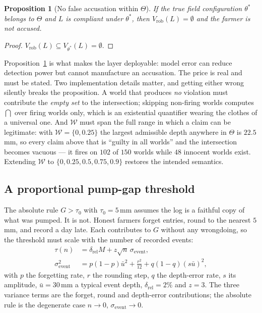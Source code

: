 \documentclass[journal]{IEEEtran}
\newtheorem{proposition}{Proposition}
\begin{document}
\begin{proposition}[No false accusation within $\Theta$]
\label{prop:noalarm}
If the true field configuration $\theta^{*}$ belongs to $\Theta$ and $L$ is
compliant under $\theta^{*}$, then $V_{\mathrm{rob}}(L)=\emptyset$ and the farmer
is not accused.
\end{proposition}

\begin{proof}
$V_{\mathrm{rob}}(L)\subseteq V_{\theta^{*}}(L)=\emptyset$.
\end{proof}

Proposition~\ref{prop:noalarm} is what makes the layer deployable: model error
can reduce detection power but cannot manufacture an accusation. The price is
real and must be stated. Two implementation details matter, and getting either
wrong silently breaks the proposition. A world that produces \emph{no} violation
must contribute the \emph{empty set} to the intersection; skipping non-firing
worlds computes $\bigcap$ over firing worlds only, which is an existential
quantifier wearing the clothes of a universal one. And $\mathcal{W}$ must span the
full range in which a claim can be legitimate: with
$\mathcal{W}=\{0,0.25\}$ the largest admissible depth anywhere in $\Theta$ is
$22.5$\,mm, so every claim above that is ``guilty in all worlds'' and the
intersection becomes vacuous --- it fires on $102$ of $150$ worlds while $48$
innocent worlds exist. Extending $\mathcal{W}$ to $\{0,0.25,0.5,0.75,0.9\}$
restores the intended semantics.

\subsection{A proportional pump-gap threshold}

The absolute rule $G>\tau_0$ with $\tau_0=5$\,mm assumes the log is a faithful
copy of what was pumped. It is not. Honest farmers forget entries, round to the
nearest $5$\,mm, and record a day late. Each contributes to $G$ without any
wrongdoing, so the threshold must scale with the number of recorded events:
\begin{equation}
\begin{aligned}
\tau(n)&=\delta_{\mathrm{rel}}M+z\sqrt{n}\,\sigma_{\mathrm{event}},\\
\sigma_{\mathrm{event}}^{2}&=p(1-p)\bar u^{2}+\tfrac{r^{2}}{12}
+q(1-q)(s\bar u)^{2},
\end{aligned}
\label{eq:tau}
\end{equation}
with $p$ the forgetting rate, $r$ the rounding step, $q$ the depth-error rate,
$s$ its amplitude, $\bar u=30$\,mm a typical event depth, $\delta_{\mathrm{rel}}=2\%$
and $z=3$. The three variance terms are the forget, round and depth-error
contributions; the absolute rule is the degenerate case $n\to 0$,
$\sigma_{\mathrm{event}}\to 0$.
\end{document}
